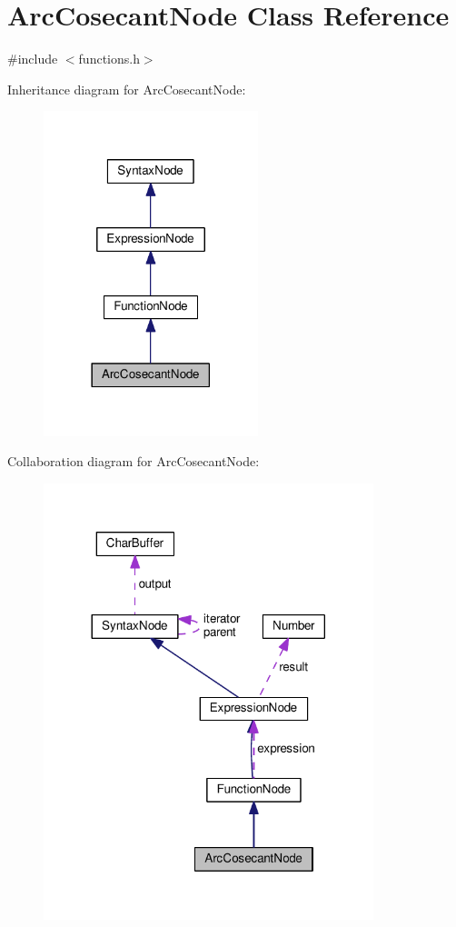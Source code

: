 \hypertarget{classArcCosecantNode}{}\section{Arc\+Cosecant\+Node Class Reference}
\label{classArcCosecantNode}


{\ttfamily \#include $<$functions.\+h$>$}



Inheritance diagram for Arc\+Cosecant\+Node\+:
\nopagebreak
\begin{figure}[H]
\begin{center}
\leavevmode
\includegraphics[width=177pt]{de/da4/classArcCosecantNode__inherit__graph}
\end{center}
\end{figure}


Collaboration diagram for Arc\+Cosecant\+Node\+:
\nopagebreak
\begin{figure}[H]
\begin{center}
\leavevmode
\includegraphics[width=272pt]{de/d59/classArcCosecantNode__coll__graph}
\end{center}
\end{figure}
